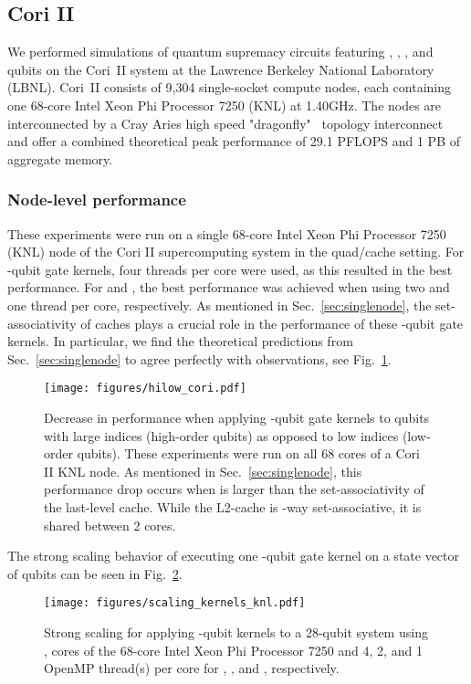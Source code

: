 \documentclass[sigconf]{acmart}
\begin{document}
\subsection{Cori II}
We performed simulations of quantum supremacy circuits featuring , , , and  qubits on the Cori~II system at the Lawrence Berkeley National Laboratory (LBNL). {Cori~II} consists of 9,304 single-socket compute nodes, each containing one 68-core Intel\textregistered{} Xeon Phi\texttrademark{} Processor 7250 (KNL) at 1.40GHz. The nodes are interconnected by a Cray Aries high speed "dragonfly"~\cite{kim2008dragonfly} topology interconnect and offer a combined theoretical peak performance of 29.1 PFLOPS and 1 PB of aggregate memory.

\subsubsection{Node-level performance}

These experiments were run on a single 68-core Intel\textregistered{} Xeon Phi\texttrademark{} Processor 7250 (KNL) node of the Cori II supercomputing system in the quad/cache setting. For -qubit gate kernels, four threads per core were used, as this resulted in the best performance. For  and , the best performance was achieved when using two and one thread per core, respectively.
As mentioned in Sec.~\ref{sec:singlenode}, the set-associativity of caches plays a crucial role in the performance of these -qubit gate kernels. In particular, we find the theoretical predictions from Sec.~\ref{sec:singlenode} to agree perfectly with observations, see Fig.~\ref{fig:hilow}.
\begin{figure}[t]
	\texttt{[image: figures/hilow\_cori.pdf]}
	\caption{Decrease in performance when applying -qubit gate kernels to qubits with large indices (high-order qubits) as opposed to low indices (low-order qubits). These experiments were run on all 68 cores of a Cori II KNL node. As mentioned in Sec.~\ref{sec:singlenode}, this performance drop occurs when  is larger than the set-associativity of the last-level cache. While the L2-cache is -way set-associative, it is shared between 2 cores.}
	\label{fig:hilow}
\end{figure}
The strong scaling behavior of executing one -qubit gate kernel on a state vector of  qubits can be seen in Fig.~\ref{fig:strongnodescalingknl}.

\begin{figure}[t]
	\texttt{[image: figures/scaling\_kernels\_knl.pdf]}
	\caption{Strong scaling for applying -qubit kernels to a 28-qubit system using ,  cores of the 68-core Intel\textregistered{} Xeon Phi\texttrademark{} Processor 7250 and 4, 2, and 1 OpenMP thread(s) per core for , , and , respectively.}
	\label{fig:strongnodescalingknl}
\end{figure}
\end{document}

